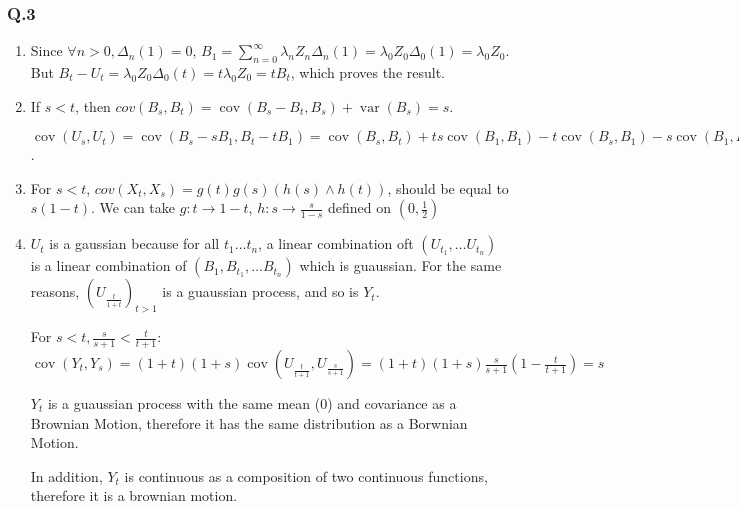 \documentclass[12pt]{article}
\newcommand{\Q}[1]{\subsubsection*{Q.#1}}
\DeclareMathOperator{\cov}{cov}
\DeclareMathOperator{\var}{var}
\begin{document}
\Q{3}
\begin{enumerate}[label=(\alph*)]
\item Since $\forall n > 0, \Delta_n(1) = 0$, $B_1 = \sum_{n=0}^{\infty} \lambda_n Z_n \Delta_n(1) = \lambda_0 Z_0 \Delta_0(1) = \lambda_0Z_0$.
  But $B_t - U_t = \lambda_0 Z_0 \Delta_0(t) = t\lambda_0 Z_0 = t B_t$, which proves the result.
\item
  If $s < t$, then $cov(B_s, B_t) = \cov(B_s - B_t, B_s) + \var(B_s) = s$.
  
  $\cov(U_s, U_t) = \cov(B_s - sB_1, B_t -tB_1) = \cov(B_s, B_t) + ts \cov(B_1, B_1) - t \cov(B_s, B_1) - s\cov(B_1, B_t) = s + ts - ts - ts = s - ts = s(1- t)$.

\item
  For $s < t$, $cov(X_t, X_s) = g(t)g(s) (h(s) \wedge h(t))$, should be equal to $s(1-t)$.
  We can take $g: t \rightarrow 1 - t$, $h: s \rightarrow \frac s{1 - s}$ defined on $(0, \frac12)$

\item
  $U_t$ is a gaussian because for all $t_1 \ldots t_n$, a linear combination oft $(U_{t_1}, \ldots U_{t_n})$ is a linear combination of  $(B_1, B_{t_1}, \ldots B_{t_n})$ which is guaussian.
  For the same reasons, $(U_{\frac t{1+t}})_{t > 1}$ is a guaussian process, and so is $Y_t$.

  For $s < t, \frac s{s+1} < \frac t{t+1} $: $\cov(Y_t, Y_s) = (1+t)(1+s)\cov(U_{\frac t{t+1}}, U_{\frac s{s+1}}) = (1+t)(1+s) \frac s{s+1} (1 - \frac t{t+1}) = s$
  
  $Y_t$ is a guaussian process with the same mean (0) and covariance as a Brownian Motion, therefore it has the same distribution  as a Borwnian Motion.
  
  In addition, $Y_t$ is continuous as a composition of two continuous functions, therefore it is a brownian motion.
  
\end{enumerate}
\end{document}
